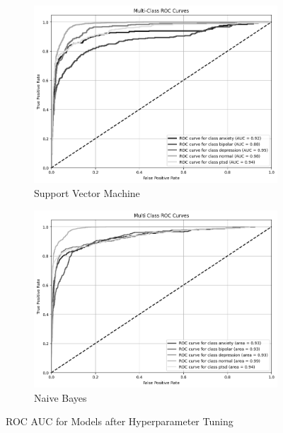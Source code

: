 \begin{figure}[H]
\begin{subfigure}[b]{0.49\textwidth}
        \includegraphics[width=\textwidth]{Images/HP SVM ROC.png}
        \caption{Support Vector Machine}
        \label{LSTMROC}  %
    \end{subfigure}
    \hfill
    \begin{subfigure}[b]{0.49\textwidth}
        \centering
        \includegraphics[width=\textwidth]{Images/HP NB ROC.png}
        \caption{Naive Bayes}
        \label{LSTMROC8}  %
    \end{subfigure}
    \label{fig:hp_lr_comparison}
    \caption{ROC AUC for Models after Hyperparameter Tuning}
\end{figure}

\pagebreak

